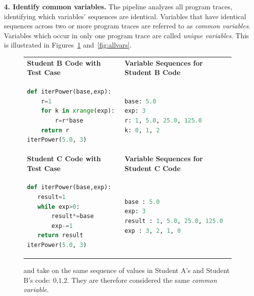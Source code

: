 {\bf 4. Identify common variables.} The pipeline analyzes all program traces, identifying which variables' sequences are identical. Variables that have identical sequences across two or more program traces are referred to as {\it common variables}. Variables which occur in only one program trace are called {\it unique variables}. This is illustrated in Figures~\ref{fig:commik} and~\ref{fig:allvars}.
\begin{figure}
\begin{tabular}{ll}
{\bf Student B Code with Test Case} & {\bf Variable Sequences for Student B Code} \\
\begin{minipage}{0.5\linewidth}
\begin{lstlisting}[basicstyle=\linespread{1.0}\ttfamily\footnotesize,language=python]
def iterPower(base,exp):
    r=1
    for k in xrange(exp):
        r=r*base
    return r
iterPower(5.0, 3)
\end{lstlisting}
\end{minipage}
&
\begin{minipage}{0.5\linewidth}
\begin{lstlisting}[language=python]
base: 5.0
exp: 3
r: 1, 5.0, 25.0, 125.0
k: 0, 1, 2
\end{lstlisting}
\end{minipage} \\
{\bf Student C Code with Test Case} & {\bf Variable Sequences for Student C Code} \\
\begin{minipage}{0.5\linewidth}
\begin{lstlisting}[basicstyle=\linespread{1.0}\ttfamily\footnotesize,language=python]
def iterPower(base,exp):
   result=1
   while exp>0:
       result*=base
       exp-=1
   return result
iterPower(5.0, 3)
\end{lstlisting}
\end{minipage}
&
\begin{minipage}{0.5\linewidth}
\begin{lstlisting}[language=python]
base : 5.0
exp: 3
result : 1, 5.0, 25.0, 125.0
exp : 3, 2, 1, 0
\end{lstlisting}
\end{minipage}
\end{tabular}
\caption{ and  take on the same sequence of values in Student A's and Student B's code: $0$,$1$,$2$. They are therefore considered the same {\it common variable}.}
\label{fig:commik}
\end{figure}
